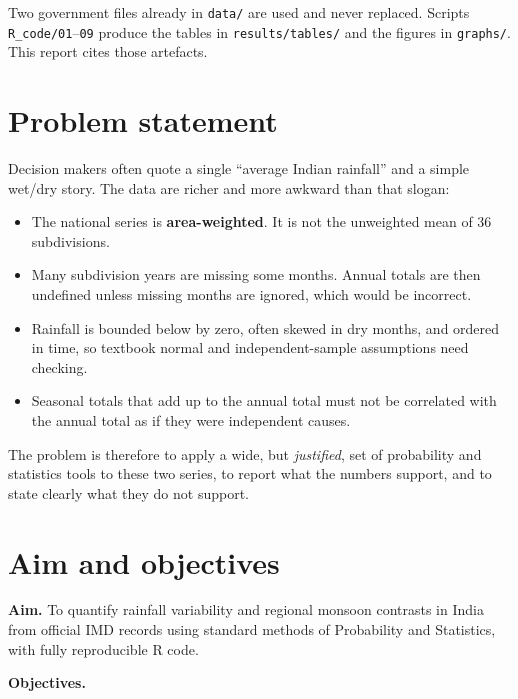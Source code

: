 \documentclass[
]{article}
\providecommand{\tightlist}{%
  \setlength{\itemsep}{0pt}\setlength{\parskip}{0pt}}
\begin{document}
Two government files already in \texttt{data/} are used and never
replaced. Scripts \texttt{R\_code/01}--\texttt{09} produce the tables in
\texttt{results/tables/} and the figures in \texttt{graphs/}. This
report cites those artefacts.

\section{Problem statement}\label{problem-statement}

Decision makers often quote a single ``average Indian rainfall'' and a
simple wet/dry story. The data are richer and more awkward than that
slogan:

\begin{itemize}
\tightlist
\item
  The national series is \textbf{area-weighted}. It is not the
  unweighted mean of 36 subdivisions.
\item
  Many subdivision years are missing some months. Annual totals are then
  undefined unless missing months are ignored, which would be incorrect.
\item
  Rainfall is bounded below by zero, often skewed in dry months, and
  ordered in time, so textbook normal and independent-sample assumptions
  need checking.
\item
  Seasonal totals that add up to the annual total must not be correlated
  with the annual total as if they were independent causes.
\end{itemize}

The problem is therefore to apply a wide, but \emph{justified}, set of
probability and statistics tools to these two series, to report what the
numbers support, and to state clearly what they do not support.

\section{Aim and objectives}\label{aim-and-objectives}

\textbf{Aim.} To quantify rainfall variability and regional monsoon
contrasts in India from official IMD records using standard methods of
Probability and Statistics, with fully reproducible R code.

\textbf{Objectives.}
\end{document}
